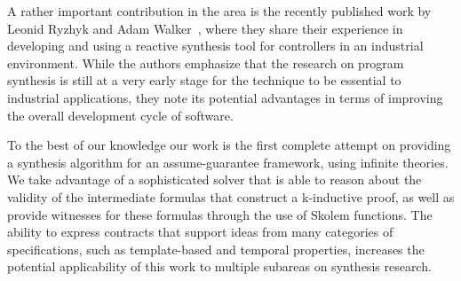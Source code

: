 A rather important contribution in the area is the recently published work by
Leonid Ryzhyk and Adam Walker~\cite{ryzhykdeveloping}, where they share their
experience in developing and using a reactive synthesis tool for controllers in
an industrial environment. While the authors emphasize that the research on
program synthesis is still at a very early stage for the technique to be
essential to industrial applications, they note its potential advantages in terms
of improving the overall development cycle of software.

To the best of our knowledge our work is the first complete attempt on providing
a synthesis algorithm for an assume-guarantee framework, using infinite theories.
We take advantage of a sophisticated solver that is able to reason about the
validity of the intermediate formulas that construct a k-inductive proof, as
well as provide witnesses for these formulas through the use of Skolem
functions. The ability to express contracts that support ideas from many
categories of specifications, such as template-based and temporal properties,
increases the potential applicability of this work to multiple subareas on
synthesis research.
\label{sec:related}

